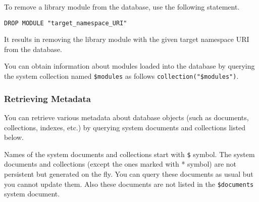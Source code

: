 \documentclass[a4paper,12pt]{article}
\begin{document}
To remove a library module from the database, use the following statement.

\begin{verbatim}
DROP MODULE "target_namespace_URI"
\end{verbatim}

It results in removing the library module with the given target namespace URI
from the database.

You can obtain information about modules loaded into the database by querying
the system collection named \verb!$modules! as follows
\verb!collection("$modules")!.


\subsubsection{Retrieving Metadata}
\label{managing-metadata}

You can retrieve various metadata about database objects (such as documents,
collections, indexes, etc.) by querying system documents and collections listed
below.

Names of the system documents and collections start with \verb!$! symbol. The
system documents and collections (except the ones marked with * symbol) are not
persistent but generated on the fly. You can query these documents as usual but
you cannot update them. Also these documents are not listed in the
\verb!$documents! system document.
\end{document}

